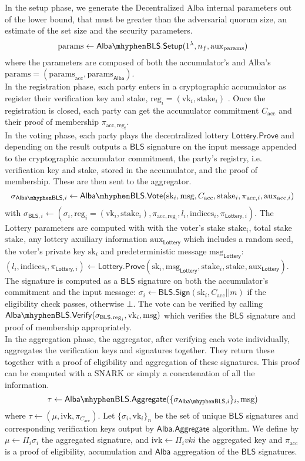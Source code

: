 \documentclass{article}
\newcommand{\vk}[1]{\ensuremath{\textrm{vk}_{#1}}\xspace}
\newcommand{\sk}[1]{\ensuremath{\textrm{sk}_{#1}}\xspace}
\newcommand{\m}{\ensuremath{\textrm{msg}}\xspace}
\newcommand{\acc}{\ensuremath{\textrm{acc}}\xspace}
\newcommand{\aux}{\ensuremath{\textrm{aux}}\xspace}
\newcommand{\pp}{\ensuremath{\textrm{params}}\xspace}
\newcommand{\reg}[1]{\ensuremath{\textrm{reg}_{#1}}\xspace}
\newcommand{\stake}[1]{\ensuremath{\textrm{stake}_{#1}}\xspace}
\newcommand{\indices}[1]{\ensuremath{\textrm{indices}_{#1}}\xspace}
\newcommand{\ivk}{\ensuremath{\textrm{ivk}}\xspace}
\newcommand{\BLS}{\ensuremath{\mathsf{BLS}}\xspace}
\newcommand{\Alba}{\ensuremath{\mathsf{Alba}}\xspace}
\newcommand{\Lottery}{\ensuremath{\mathsf{Lottery}}\xspace}
\newcommand{\Vote}{\ensuremath{\mathsf{Vote}}\xspace}
\newcommand{\AlbaBls}{\ensuremath{\mathsf{Alba}\mhyphen\mathsf{BLS}\xspace}}
\newcommand{\Sign}{\ensuremath{\mathsf{Sign}}\xspace}
\newcommand{\Verify}{\ensuremath{\mathsf{Verify}}\xspace}
\newcommand{\Aggregate}{\ensuremath{\mathsf{Aggregate}}\xspace}
\newcommand{\Setup}{\ensuremath{\mathsf{Setup}}\xspace}
\newcommand{\Prove}{\ensuremath{\mathsf{Prove}}\xspace}
\begin{document}
In the setup phase, we generate the Decentralized Alba internal parameters out of the lower bound, that must be greater than the adversarial quorum size, an estimate of the set size and the security parameters.
$$
\pp \leftarrow \AlbaBls.\Setup(1^\lambda, n_f, \aux_\pp)
$$
where the parameters are composed of both the accumulator's and Alba's $\pp = (\pp_\acc, \pp_\Alba)$.\\

In the registration phase, each party enters in a cryptographic accumulator as register their verification key and stake, $\reg{i}=(\vk{i}, \stake{i})$ . Once the registration is closed, each party can get the accumulator commitment $C_\acc$ and their proof of membership $\pi_{\acc, \reg{i}}$.\\

In the voting phase, each party plays the decentralized lottery \Lottery.\Prove and depending on the result outputs a \BLS signature on the input message appended to the cryptographic accumulator commitment, the party's registry, i.e. verification key and stake, stored in the accumulator, and the proof of membership. These are then sent to the aggregator.
$$
\sigma_{\AlbaBls, i} \leftarrow \AlbaBls.\Vote(\sk{i}, \m, C_\acc, \stake{i}, \pi_{\acc, i}, \aux_{\acc, i})
$$
with $ \sigma_{\BLS, i} \leftarrow (\sigma_i, \reg{i}=(\vk{i}, \stake{i}), \pi_{\acc, \reg{i}}, l_i, \indices{i}, \pi_{\Lottery, i})$. The Lottery parameters are computed with with the voter's stake $\stake{i}$, total stake $\stake{}$, any lottery axuiliary information $\aux_\Lottery$ which includes a random seed, the voter's private key $\sk{i}$ and predeterministic message $\m_\Lottery$: $(l_i, \indices{i}, \pi_{\Lottery, i}) \leftarrow \Lottery.\Prove(\sk{i}, \m_\Lottery, \stake{i}, \stake{}, \aux_\Lottery)$. The signature is computed as a \BLS signature on both the accumulator's commitment and the input message: $\sigma_i \leftarrow \BLS.\Sign(\sk{i}, C_\acc || m)$ if the eligibility check passes, otherwise $\bot$.
The vote can be verified by calling $\AlbaBls.\Verify(\sigma_{\BLS, \reg{i}}, \vk{i}, \m)$ which verifies the \BLS signature and proof of membership appropriately.\\

In the aggregation phase, the aggregator, after verifying each vote individually, aggregates the verification keys and signatures together. They return these together with a proof of eligibility and aggregation of these signatures. This proof can be computed with a SNARK or simply a concatenation of all the information.
$$
\tau \leftarrow \AlbaBls.\Aggregate(\{\sigma_{\AlbaBls,i}\}_i, \m)
$$
where $\tau \leftarrow (\mu, \ivk, \pi_{C_\acc})$. Let $\{\sigma_i, \vk{i}\}_n$ be the set of unique \BLS signatures and corresponding verification keys output by \Alba.\Aggregate algorithm. We define by $\mu \leftarrow \Pi_i \sigma_i$ the aggregated signature, and $\ivk \leftarrow \Pi_i vk{i}$ the aggregated key and $\pi_\acc$ is a proof of eligibility, accumulation and \Alba aggregation of the \BLS signatures.\\
\end{document}
